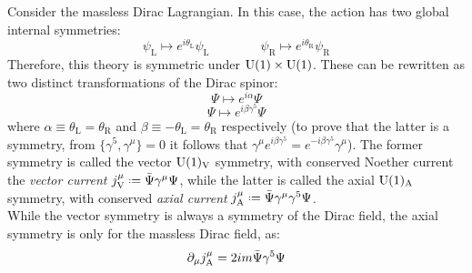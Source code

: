 Consider the massless Dirac Lagrangian. In this case, the action has two global internal symmetries:
\begin{equation*}
  \psi_\text{L} \mapsto e^{i \theta_\text{L}} \psi_\text{L}
  \qquad \qquad
  \psi_\text{R} \mapsto e^{i \theta_\text{R}} \psi_\text{R}
\end{equation*}
Therefore, this theory is symmetric under $ \mathrm{U}(1) \times \mathrm{U}(1) $. These can be rewritten as two distinct transformations of the Dirac spinor:
\begin{equation}
  \Psi \mapsto e^{i \alpha} \Psi
  \label{eq:1.98}
\end{equation}
\begin{equation}
  \Psi \mapsto e^{i \beta \gamma^5} \Psi
  \label{eq:1.99}
\end{equation}
where $ \alpha \equiv \theta_\text{L} = \theta_\text{R} $ and $ \beta \equiv - \theta_\text{L} = \theta_\text{R} $ respectively (to prove that the latter is a symmetry, from $ \{\gamma^5, \gamma^\mu\} = 0 $ it follows that $ \gamma^\mu e^{i \beta \gamma^5} = e^{-i \beta \gamma^5} \gamma^\mu $). The former symmetry is called the vector $ \mathrm{U}(1)_\text{V} $ symmetry, with conserved Noether current the \textit{vector current} $ j^\mu_\text{V} \defeq \bar{\Psi} \gamma^\mu \Psi $, while the latter is called the axial $ \mathrm{U}(1)_\text{A} $ symmetry, with conserved \textit{axial current} $ j^\mu_\text{A} \defeq \bar{\Psi} \gamma^\mu \gamma^5 \Psi $.\\
While the vector symmetry is always a symmetry of the Dirac field, the axial symmetry is only for the massless Dirac field, as:
\begin{equation}
  \partial_\mu j^\mu_\text{A} = 2 i m \bar{\Psi} \gamma^5 \Psi
  \label{eq:1.100}
\end{equation}










